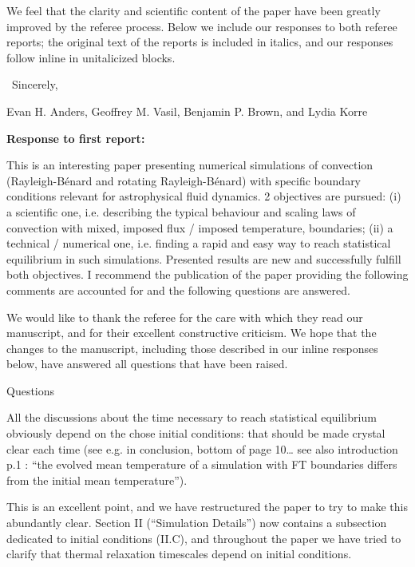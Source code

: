 \documentclass[aps, 11pt, singlecolumn]{revtex4-1} %
\begin{document}
\begin{singlespace}
We feel that the clarity and scientific content of the paper have been greatly improved by the referee process. 
Below we include our responses to both referee reports; the original text of the reports is included in italics, and our responses follow inline in unitalicized blocks.

$\,$\newline
\noindent
Sincerely,

Evan H. Anders, Geoffrey M. Vasil, Benjamin P. Brown, and Lydia Korre



\newpage
\noindent
\Large{\textbf{Response to first report:}}\newline$\,$\newline\indent

\begin{myquotation}
This is an interesting paper presenting numerical simulations of convection (Rayleigh-B\'{e}nard and rotating Rayleigh-B\'{e}nard) with specific boundary conditions relevant for astrophysical fluid dynamics. 
2 objectives are pursued: (i) a scientific one, i.e. describing the typical behaviour and scaling laws of convection with mixed, imposed flux / imposed temperature, boundaries; (ii) a technical / numerical one, i.e. finding a rapid and easy way to reach statistical equilibrium in such simulations. 
Presented results are new and successfully fulfill both objectives. 
I recommend the publication of the paper providing the following comments are accounted for and the following questions are answered.
\end{myquotation}

We would like to thank the referee for the care with which they read our manuscript, and for their excellent constructive criticism.
We hope that the changes to the manuscript, including those described in our inline responses below, have answered all questions that have been raised.


\begin{myquotation}
Questions

All the discussions about the time necessary to reach statistical equilibrium obviously depend on the chose initial conditions: that should be made crystal clear each time (see e.g. in conclusion, bottom of page 10… see also introduction p.1 : ``the evolved mean temperature of a simulation with FT boundaries differs from the initial mean temperature'').
\end{myquotation}
This is an excellent point, and we have restructured the paper to try to make this abundantly clear.
Section II (``Simulation Details'') now contains a subsection dedicated to initial conditions (II.C), and throughout the paper we have tried to clarify that thermal relaxation timescales depend on initial conditions.


\end{singlespace}
\end{document}
